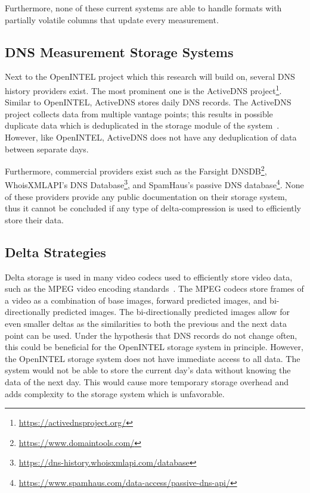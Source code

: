 Furthermore, none of these current systems are able to handle formats with partially 
volatile columns that update every measurement.

\subsection{DNS Measurement Storage Systems}

Next to the OpenINTEL project which this research will build on, several DNS 
history providers exist. The most prominent one is the ActiveDNS 
project\footnote{\url{https://activednsproject.org/}}. Similar to OpenINTEL, ActiveDNS stores 
daily DNS records. The ActiveDNS project collects data from multiple vantage points; 
this results in possible duplicate data which is deduplicated in the storage module 
of the system~\cite{DBLP:conf/raid/KountourasKLCND16}. However, like OpenINTEL, 
ActiveDNS does not have any deduplication of data between separate days. 

Furthermore, commercial providers exist such as the Farsight 
DNSDB\footnote{\url{https://www.domaintools.com/}}, WhoisXMLAPI's DNS 
Database\footnote{\url{https://dns-history.whoisxmlapi.com/database}}, and SpamHaus's
passive DNS database\footnote{\url{https://www.spamhaus.com/data-access/passive-dns-api/}}. 
None of these providers provide any public documentation on their storage system, thus 
it cannot be concluded if any type of delta-compression is used to efficiently store their data.

\subsection{Delta Strategies}

Delta storage is used in many video codecs used to efficiently store video data, such as the MPEG video encoding 
standards~\cite{isoiec11172}. The MPEG codecs store frames of a video as a combination 
of base images, forward predicted images, and bi-directionally predicted images. The 
bi-directionally predicted images allow for even smaller deltas as the similarities to both 
the previous and the next data point can be used. Under the hypothesis that DNS records 
do not change often, this could be beneficial for the OpenINTEL storage system in principle.
However, the OpenINTEL storage system does not have immediate access to all data. 
The system would not be able to store the current day's data without knowing the data of the 
next day. This would cause more temporary storage overhead and adds complexity to the 
storage system which is unfavorable.

